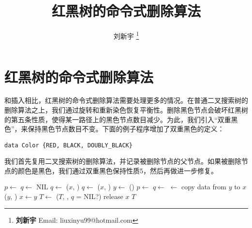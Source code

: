 \documentclass[b5paper]{ctexart}
\begin{document}
\title{红黑树的命令式删除算法}

\author{刘新宇
\thanks{{\bfseries 刘新宇} \newline
  Email: liuxinyu99@hotmail.com \newline}
  }

\maketitle
\fi


\ifx\wholebook\relax
\chapter{红黑树的命令式删除算法}
\fi


和插入相比，红黑树的命令式删除算法需要处理更多的情况。在普通二叉搜索树的删除算法之上，我们通过旋转和重新染色恢复平衡性。删除黑色节点会破坏红黑树的第五条性质，使得某一路径上的黑色节点数目减少。为此，我们引入“双重黑色”，来保持黑色节点数目不变。下面的例子程序增加了双重黑色的定义：


\lstset{frame = single}
\begin{lstlisting}[language = Bourbaki]
data Color {RED, BLACK, DOUBLY_BLACK}
\end{lstlisting}

我们首先复用二叉搜索树的删除算法，并记录被删除节点的父节点。如果被删除节点的颜色是黑色，我们通过双重黑色保持性质5，然后再做进一步修复。

\begin{algorithmic}[1]
  \State $p \gets$ 
  \State $q \gets$ NIL
    \State $q \gets$ 
    \State {}($x$, ) 
    \State $q \gets$ 
    \State {}($x$, ) 
  \Else
    \State $y \gets$ ()
    \State $p \gets$ 
    \State $q \gets$ 
    \State {} $\gets$ 
    \State copy data from $y$ to $x$
    \State {}($y$, ) 
    \State $x \gets y$
  \EndIf
    \State $T \gets$ ($T$, , $q$ = NIL?)
  \EndIf
  \State release $x$
  \State \Return $T$
\EndFunction
\end{algorithmic}
\end{document}
